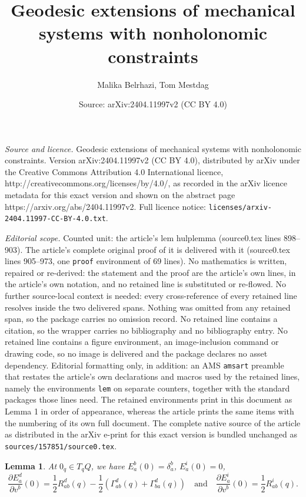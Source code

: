 \documentclass[10pt,a4paper]{amsart}
\title{Geodesic extensions of mechanical systems with nonholonomic constraints}
\author{Malika Belrhazi, Tom Mestdag}
\date{Source: arXiv:2404.11997v2 (CC BY 4.0)}
\newtheorem{lem}{Lemma}
\begin{document}
\maketitle

\noindent\emph{Source and licence.} Geodesic extensions of mechanical systems with nonholonomic constraints. Version arXiv:2404.11997v2 (CC BY 4.0), distributed by arXiv under the Creative Commons Attribution 4.0 International licence, http://creativecommons.org/licenses/by/4.0/, as recorded in the arXiv licence metadata for this exact version and shown on the abstract page https://arxiv.org/abs/2404.11997v2. Full licence notice: \texttt{licenses/arxiv-2404.11997-CC-BY-4.0.txt}.\par\smallskip

\noindent\textit{Editorial scope.} Counted unit: the article's lem hulplemma (source0.tex lines 898--903). The article's complete original proof of it is delivered with it (source0.tex lines 905--973, one \texttt{proof} environment of 69 lines). No mathematics is written, repaired or re-derived: the statement and the proof are the article's own lines, in the article's own notation, and no retained line is substituted or re-flowed.  No further source-local context is needed: every cross-reference of every retained line resolves inside the two delivered spans.  Nothing was omitted from any retained span, so the package carries no omission record.  No retained line contains a citation, so the wrapper carries no bibliography and no bibliography entry.  No retained line contains a figure environment, an image-inclusion command or drawing code, so no image is delivered and the package declares no asset dependency.  Editorial formatting only, in addition: an AMS \texttt{amsart} preamble that restates the article's own declarations and macros used by the retained lines, namely the environments \texttt{lem} on separate counters, together with the standard packages those lines need.  The retained environments print in this document as Lemma 1 in order of appearance, whereas the article prints the same items with the numbering of its own full document.  The complete native source of the article as distributed in the arXiv e-print for this exact version is bundled unchanged as \texttt{sources/157851/source0.tex}.
\begin{lem} \label{hulplemma} At $0_q\in T_qQ$, we have 
$E_a^b(0)=\delta_a^b$, $E_a^i(0)=0$,
$$
\frac{\partial E^d_a}{\partial v^b}(0)=\frac{1}{2}R^d_{ab}(q)-\frac{1}{2}(\Gamma_{ab}^d(q)+\Gamma^d_{ba}(q)) \quad\text{and}\quad \frac{\partial E^i_a}{\partial v^b}(0)=\frac{1}{2}R^i_{ab}(q).
$$
\end{lem}
\end{document}
